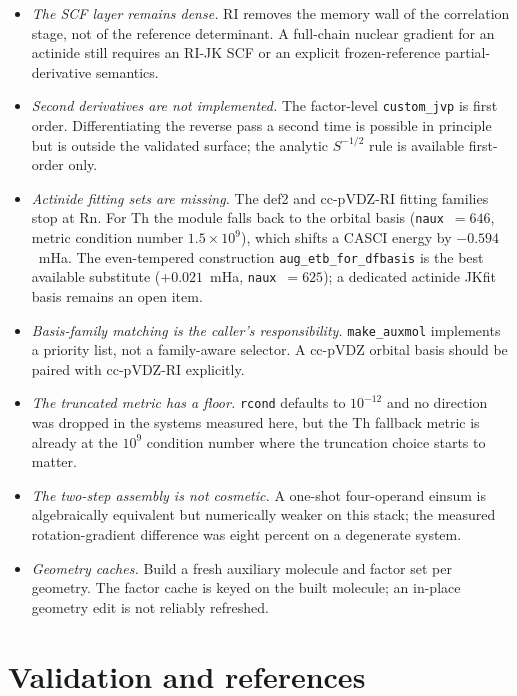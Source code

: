 \begin{itemize}
\item \emph{The SCF layer remains dense.}  RI removes the memory wall
  of the correlation stage, not of the reference determinant.  A
  full-chain nuclear gradient for an actinide still requires an RI-JK
  SCF or an explicit frozen-reference partial-derivative semantics.
\item \emph{Second derivatives are not implemented.}  The factor-level
  \texttt{custom\_jvp} is first order.  Differentiating the reverse
  pass a second time is possible in principle but is outside the
  validated surface; the analytic $S^{-1/2}$ rule is available
  first-order only.
\item \emph{Actinide fitting sets are missing.}  The def2 and
  cc-pVDZ-RI fitting families stop at Rn.  For Th the module falls back
  to the orbital basis (\texttt{naux}~$=646$, metric condition number
  $1.5\times10^{9}$), which shifts a CASCI energy by $-0.594$~mHa.  The
  even-tempered construction \texttt{aug\_etb\_for\_dfbasis} is the best
  available substitute ($+0.021$~mHa, \texttt{naux}~$=625$); a
  dedicated actinide JKfit basis remains an open item.
\item \emph{Basis-family matching is the caller's responsibility.}
  \texttt{make\_auxmol} implements a priority list, not a family-aware
  selector.  A cc-pVDZ orbital basis should be paired with cc-pVDZ-RI
  explicitly.
\item \emph{The truncated metric has a floor.}  \texttt{rcond} defaults
  to $10^{-12}$ and no direction was dropped in the systems measured
  here, but the Th fallback metric is already at the $10^{9}$ condition
  number where the truncation choice starts to matter.
\item \emph{The two-step assembly is not cosmetic.}  A one-shot
  four-operand einsum is algebraically equivalent but numerically
  weaker on this stack; the measured rotation-gradient difference was
  eight percent on a degenerate system.
\item \emph{Geometry caches.}  Build a fresh auxiliary molecule and
  factor set per geometry.  The factor cache is keyed on the built
  molecule; an in-place geometry edit is not reliably refreshed.
\end{itemize}

\section{Validation and references}
\label{sec:ri-validation}

